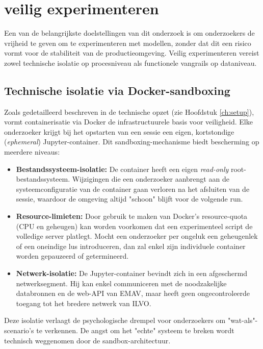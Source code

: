 \chapter{veilig experimenteren}
Een van de belangrijkste doelstellingen van dit onderzoek is om onderzoekers de vrijheid te geven om te experimenteren met modellen, zonder dat dit een risico vormt voor de stabiliteit van de productieomgeving. Veilig experimenteren vereist zowel technische isolatie op procesniveau als functionele vangrails op dataniveau.
\section{Technische isolatie via Docker-sandboxing}
Zoals gedetailleerd beschreven in de technische opzet (zie Hoofdstuk \ref{ch:setup}), vormt containerisatie via Docker de infrastructuurele basis voor veiligheid. Elke onderzoeker krijgt bij het opstarten van een sessie een eigen, kortstondige (\textit{ephemeral}) Jupyter-container.
Dit sandboxing-mechanisme biedt bescherming op meerdere niveaus:
\begin{itemize}
    \item \textbf{Bestandssysteem-isolatie:} De container heeft een eigen \textit{read-only} root-bestandssysteem. Wijzigingen die een onderzoeker aanbrengt aan de systeemconfiguratie van de container gaan verloren na het afsluiten van de sessie, waardoor de omgeving altijd "schoon" blijft voor de volgende run.
    \item \textbf{Resource-limieten:} Door gebruik te maken van Docker's resource-quota (CPU en geheugen) kan worden voorkomen dat een experimenteel script de volledige server platlegt. Mocht een onderzoeker per ongeluk een geheugenlek of een oneindige lus introduceren, dan zal enkel zijn individuele container worden gepauzeerd of getermineerd.
    \item \textbf{Netwerk-isolatie:} De Jupyter-container bevindt zich in een afgeschermd netwerksegment. Hij kan enkel communiceren met de noodzakelijke databronnen en de web-API van EMAV, maar heeft geen ongecontroleerde toegang tot het bredere netwerk van ILVO.
\end{itemize}
Deze isolatie verlaagt de psychologische drempel voor onderzoekers om "wat-als"-scenario's te verkennen. De angst om het "echte" systeem te breken wordt technisch weggenomen door de sandbox-architectuur.
